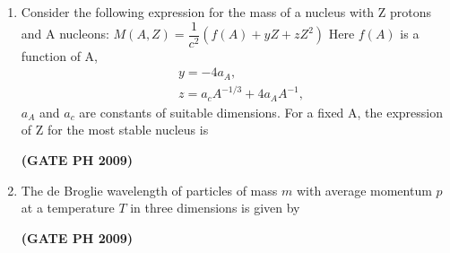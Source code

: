 \documentclass[14pt, a4paper]{extarticle}
\begin{document}
\begin{enumerate}[label=\textbf{Q. \arabic*}, start=21]
\item Consider the following expression for the mass of a nucleus with Z protons and A nucleons:
$M(A,Z) = \dfrac{1}{c^2}(f(A) + yZ + zZ^2)$
Here $f(A)$ is a function of A,
\begin{align*}
& y = -4a_A, \\
& z = a_c A^{-1/3} + 4a_A A^{-1},
\end{align*}
$a_A$ and $a_c$ are constants of suitable dimensions. For a fixed A, the expression of Z for the most stable nucleus is
\begin{enumerate}
\end{enumerate}
\hfill \textbf{(GATE PH 2009)}

\item The de Broglie wavelength of particles of mass $m$ with average momentum $p$ at a temperature $T$ in three dimensions is given by
\begin{enumerate}
\end{enumerate}
\hfill \textbf{(GATE PH 2009)}

\vspace{14em}


\end{enumerate}
\end{document}
